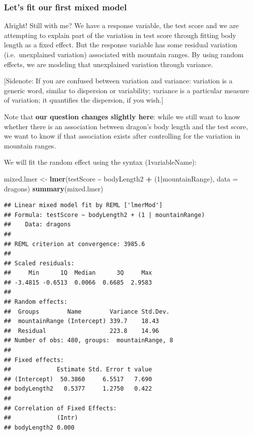 \documentclass[
]{article}
\newenvironment{Shaded}{\begin{snugshade}}{\end{snugshade}}
\newcommand{\AttributeTok}[1]{\textcolor[rgb]{0.13,0.29,0.53}{#1}}
\newcommand{\DecValTok}[1]{\textcolor[rgb]{0.00,0.00,0.81}{#1}}
\newcommand{\FunctionTok}[1]{\textcolor[rgb]{0.13,0.29,0.53}{\textbf{#1}}}
\newcommand{\NormalTok}[1]{#1}
\newcommand{\OtherTok}[1]{\textcolor[rgb]{0.56,0.35,0.01}{#1}}
\newcommand{\SpecialCharTok}[1]{\textcolor[rgb]{0.81,0.36,0.00}{\textbf{#1}}}
\begin{document}
\subsubsection{Let's fit our first mixed
model}\label{lets-fit-our-first-mixed-model}

Alright! Still with me? We have a response variable, the test score and
we are attempting to explain part of the variation in test score through
fitting body length as a fixed effect. But the response variable has
some residual variation (i.e.~unexplained variation) associated with
mountain ranges. By using random effects, we are modeling that
unexplained variation through variance.

{[}Sidenote: If you are confused between variation and variance:
variation is a generic word, similar to dispersion or variability;
variance is a particular measure of variation; it quantifies the
dispersion, if you wish.{]}

Note that \textbf{our question changes slightly here}: while we still
want to know whether there is an association between dragon's body
length and the test score, we want to know if that association exists
after controlling for the variation in mountain ranges.

We will fit the random effect using the syntax (1\textbar variableName):

\begin{Shaded}
\begin{Highlighting}[]
\NormalTok{mixed.lmer }\OtherTok{\textless{}{-}} \FunctionTok{lmer}\NormalTok{(testScore }\SpecialCharTok{\textasciitilde{}}\NormalTok{ bodyLength2 }\SpecialCharTok{+}\NormalTok{ (}\DecValTok{1}\SpecialCharTok{|}\NormalTok{mountainRange), }\AttributeTok{data =}\NormalTok{ dragons)}
\FunctionTok{summary}\NormalTok{(mixed.lmer)}
\end{Highlighting}
\end{Shaded}

\begin{verbatim}
## Linear mixed model fit by REML ['lmerMod']
## Formula: testScore ~ bodyLength2 + (1 | mountainRange)
##    Data: dragons
## 
## REML criterion at convergence: 3985.6
## 
## Scaled residuals: 
##     Min      1Q  Median      3Q     Max 
## -3.4815 -0.6513  0.0066  0.6685  2.9583 
## 
## Random effects:
##  Groups        Name        Variance Std.Dev.
##  mountainRange (Intercept) 339.7    18.43   
##  Residual                  223.8    14.96   
## Number of obs: 480, groups:  mountainRange, 8
## 
## Fixed effects:
##             Estimate Std. Error t value
## (Intercept)  50.3860     6.5517   7.690
## bodyLength2   0.5377     1.2750   0.422
## 
## Correlation of Fixed Effects:
##             (Intr)
## bodyLength2 0.000
\end{verbatim}
\end{document}
